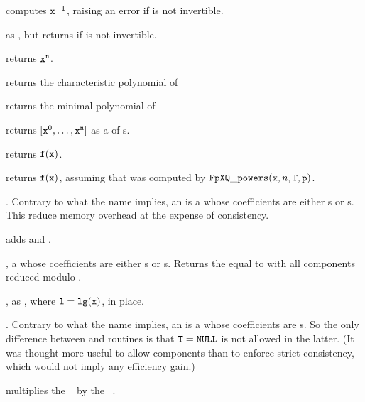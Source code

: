  computes ${\tt x}^{-1}$, raising an
error if  is not invertible.

 as , but returns
 if  is not invertible.

 returns ${\tt x}^{\tt n}$.

 returns the characteristic
polynomial of 

 returns the minimal polynomial
of 

 returns $[{\tt x}^0,
\dots, {\tt x}^{\tt n}]$ as a  of s.

 returns
${\tt f}({\tt x})$.

 returns
${\tt f}({\tt x})$, assuming that  was computed by
${\tt FpXQ\_powers}({\tt x}, n, {\tt T}, {\tt p})$.

.
Contrary to what the name implies, an  is a  whose
coefficients are either s or s. This reduce memory
overhead at the expense of consistency.

 adds  and . 

,  a  whose coefficients are
either s or s. Returns the  equal to  with
all components reduced modulo .

, as , where
${\tt l} = {\tt lg(x)}$, in place.

.
Contrary to what the name implies, an  is a  whose
coefficients are s. So the only difference between  and
 routines is that ${\tt T} = {\tt NULL}$ is not allowed in the
latter. (It was thought more useful to allow  components than to
enforce strict consistency, which would not imply any efficiency gain.)



 multiplies the
~ by the ~.

